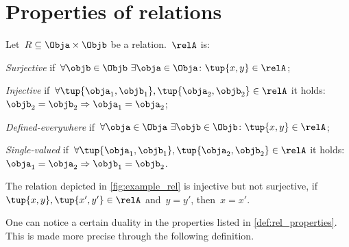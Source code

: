 

\section{Properties of relations}


\begin{definition}
  \label{def:rel_properties}
  Let~$R\subseteq \Obja \times \Objb$ be a relation.~$\relA$ is:
  \begin{compactenum}
    \item \emph{Surjective} if~$\forall \objb\in \Objb \ \exists \obja\in \Obja\colon \tup{x,y}\in \relA$;
    \item \emph{Injective} if~$\forall \tup{\obja_1,\objb_1},\tup{\obja_2,\objb_2}\in \relA$ it holds:~$\objb_2=\objb_2 \Rightarrow \obja_1=\obja_2$;
    \item \emph{Defined-everywhere} if~$\forall \obja\in \Obja \ \exists \objb \in \Objb\colon \tup{x,y}\in \relA$;
    \item \emph{Single-valued} if~$\forall \tup{\obja_1,\objb_1},\tup{\obja_2,\objb_2}\in \relA$ it holds:~$\obja_1=\obja_2\Rightarrow \objb_1=\objb_2$.
  \end{compactenum}
\end{definition}

\begin{example}
  The relation depicted in \cref{fig:example_rel} is injective but not surjective, \ie  if~$\tup{x,y},\tup{x',y'}\in \relA$ and~$y=y'$, then~$x=x'$.
\end{example}

One can notice a certain duality in the properties listed in \cref{def:rel_properties}. This is made more precise through the following definition.


